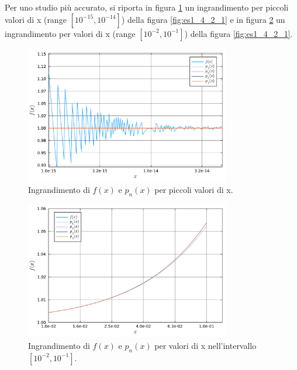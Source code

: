 \documentclass[letterpaper, 12pt]{article}
\begin{document}
Per uno studio più accurato, si riporta in figura \ref{fig:es1_4_2_2} un ingrandimento per piccoli valori di x 
(range $[10^{-15}, 10^{-14}]$) della figura \ref{fig:es1_4_2_1} e in figura \ref{fig:es1_4_2_3} un ingrandimento 
per valori di x (range $[10^{-2}, 10^{-1}]$) della figura \ref{fig:es1_4_2_1}.
\begin{figure}[!ht]
    \centering
    \includegraphics[width=0.8\textwidth]{1422.pdf}
    \caption{Ingrandimento di $f(x)$ e $p_n(x)$ per piccoli valori di x.}
    \label{fig:es1_4_2_2}
\end{figure}
\begin{figure}[!ht]
    \centering
    \includegraphics[width=0.8\textwidth]{1423.pdf}
    \caption{Ingrandimento di $f(x)$ e $p_n(x)$ per valori di x nell'intervallo $[10^{-2}, 10^{-1}]$.}
    \label{fig:es1_4_2_3}
\end{figure}
\end{document}
